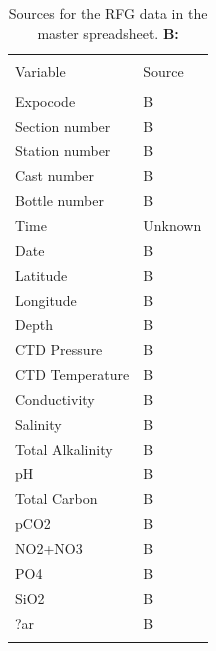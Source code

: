 \documentclass[journal, a4paper]{article} %
\begin{document}
\begin{table}[H] \centering 
  \caption{Sources for the RFG data in the master spreadsheet. \textbf{B:} \protect{}}
  \label{t:RFGsources} 
\begin{tabular}{p{3cm}p{10cm}}%
\\[-1.8ex]\hline 
\hline \\[-1.8ex] 
 Variable & Source\\ 
\hline \\[-1.8ex] 
Expocode & B\\[8pt] 
Section number & B\\[8pt] 
Station number & B\\[8pt] 
Cast number & B\\[8pt] 
Bottle number & B\\[8pt] 
Time & Unknown\\[8pt] 
Date & B\\[8pt] 
Latitude & B\\[8pt] 
Longitude  & B\\[8pt] 
Depth  & B\\[8pt] 
CTD Pressure & B\\[8pt] 
CTD Temperature & B\\[8pt] 
Conductivity  & B\\[8pt] 
Salinity & B\\[8pt] 
Total Alkalinity & B\\[8pt] 
pH & B\\[8pt] 
Total Carbon & B\\[8pt] 
pCO2 & B\\[8pt] 
NO2+NO3 & B\\[8pt] 
PO4 & B\\[8pt] 
SiO2 & B\\[8pt] 
?ar & B\\[8pt] 
\hline \\[-1.8ex]
\end{tabular} 
\end{table} 
\end{document}
